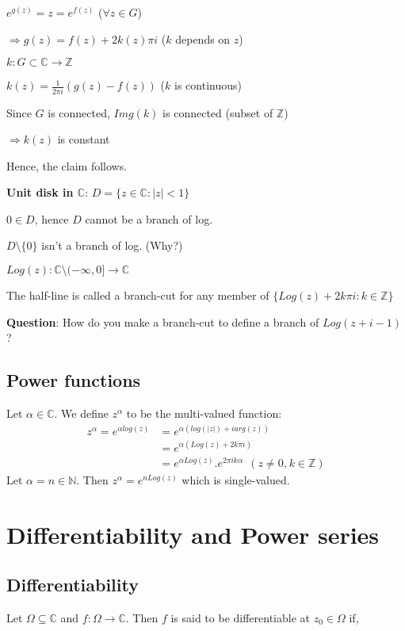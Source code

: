 \documentclass{article}
\begin{document}
\begin{flushleft}
$e^{g(z)}=z=e^{f(z)}$ ($\forall z\in G$)

$\Rightarrow g(z)=f(z)+ 2k(z)\pi i$ ($k$ depends on $z$)

$k: G\subset \mathds{C}\rightarrow \mathds{Z}$

$k(z)=\frac{1}{2\pi i}(g(z)-f(z))$ ($k$ is continuous)

Since $G$ is connected, $Img(k)$ is connected  (subset of $\mathds{Z}$)

$\Rightarrow k(z)$ is constant 

Hence, the claim follows.

\textbf{Unit disk in $\mathds{C}$}: $D=\{z\in \mathds{C}: |z|< 1\}$

$0\in D$, hence $D$ cannot be a branch of log. 

$D\setminus \{0\}$ isn't a branch of log. (Why?)

$Log(z): \mathds{C}\setminus (-\infty,0]\rightarrow \mathds{C}$

The half-line is called a branch-cut for any member of $\{Log(z)+2k\pi i: k\in \mathds{Z}\}$

\textbf{Question}: How do you make a branch-cut to define a branch of $Log(z+i-1)$?

\subsection{\textbf{Power functions}}

Let $\alpha \in \mathds{C}$. We define $z^{\alpha}$ to be the multi-valued function:
\begin{align} 
z^{\alpha}=e^{\alpha log(z)}&= e^{\alpha(log(|z|)+ iarg(z))}\nonumber\\
&= e^{\alpha(Log(z)+2k\pi i)}\nonumber\\
&=e^{\alpha Log(z)}.e^{2\pi ik\alpha} \:\:(z\neq 0\text{,} \:k\in \mathds{Z})\nonumber
\end{align}
Let $\alpha=n \in \mathds{N}$. Then $z^{\alpha}=e^{nLog(z)}$ which is single-valued.
\clearpage
\section{Differentiability and Power series}

\subsection{\textbf{Differentiability}} 

Let $\Omega \subseteq \mathds{C}$ and $f: \Omega \rightarrow \mathds{C}$. Then $f$ is said to be differentiable at $z_0\in \Omega$ if,


\end{flushleft}
\end{document}
